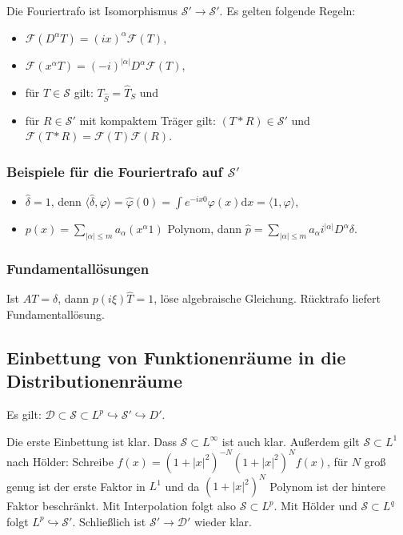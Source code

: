 \documentclass[11pt,a4paper]{scrartcl}
\newcommand{\D}{\mathcal{D}}
\newcommand{\Sc}{\mathcal{S}}
\newcommand{\F}{\mathcal{F}}
\theoremstyle{plain}
\theoremstyle{definition}
\theoremstyle{remark}
\begin{document}
Die Fouriertrafo ist Isomorphismus $\Sc'\to\Sc'$. Es gelten folgende Regeln:

\begin{itemize}
    \item $\F(D^\alpha T) = (ix)^\alpha \F(T)$,
    \item $\F(x^\alpha T) = (-i)^{|\alpha|} D^\alpha \F(T)$,
    \item für $T\in \Sc$ gilt: $T_{\hat S} = \widehat T_S$ und
    \item für $R\in \Sc'$ mit kompaktem Träger gilt: $(T*R)\in \Sc'$ und $\F(T*R)=\F(T)\F(R)$.
\end{itemize}

\subsubsection{Beispiele für die Fouriertrafo auf $\Sc'$}

\begin{itemize}
    \item $\hat\delta = 1$, denn $\langle \hat\delta, \varphi \rangle = \hat \varphi(0) = \int e^{-ix0} \varphi(x) \mathrm{d}x = \langle 1, \varphi \rangle$,
    \item $p(x)=\sum_{|\alpha| \leq m} a_\alpha (x^\alpha 1)$ Polynom, dann $\hat p = \sum_{|\alpha| \leq m} a_\alpha i^{|\alpha|} D^\alpha \delta$.
\end{itemize}

\subsubsection{Fundamentallösungen}

Ist $AT=\delta$, dann $p(i\xi)\hat T = 1$, löse algebraische Gleichung. Rücktrafo liefert Fundamentallösung.

\subsection{Einbettung von Funktionenräume in die Distributionenräume}

Es gilt: $\D \subset \Sc \subset L^p \hookrightarrow \Sc' \hookrightarrow D'$.

Die erste Einbettung ist klar. Dass $\Sc \subset L^\infty$ ist auch klar. Außerdem gilt $\Sc \subset L^1$ nach Hölder: Schreibe $f(x)=(1+|x|^2)^{-N}(1+|x|^2)^Nf(x)$, für $N$ groß genug ist der erste Faktor in $L^1$ und da $(1+|x|^2)^N$ Polynom ist der hintere Faktor beschränkt. Mit Interpolation folgt also $\Sc \subset L^p$. Mit Hölder und $\Sc \subset L^q$ folgt $L^p \hookrightarrow \Sc'$. Schließlich ist $\Sc'\to \D'$ wieder klar.
\end{document}
